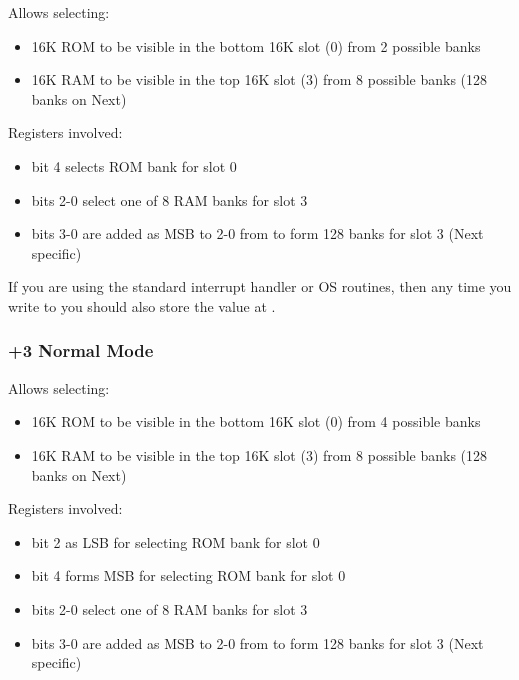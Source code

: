 Allows selecting:

\begin{itemize}[topsep=0pt,itemsep=0pt]
	\item 16K ROM to be visible in the bottom 16K slot (0) from 2 possible banks
	\item 16K RAM to be visible in the top 16K slot (3) from 8 possible banks (128 banks on Next)
\end{itemize}

Registers involved:

\begin{itemize}[topsep=0pt,itemsep=0pt]
	\item {} bit 4 selects ROM bank for slot 0
	\item {} bits 2-0 select one of 8 RAM banks for slot 3
	\item {} bits 3-0 are added as MSB to 2-0 from  to form 128 banks for slot 3 (Next specific)
\end{itemize}

If you are using the standard interrupt handler or OS routines, then any time you write to  you should also store the value at .


\subsubsection{+3 Normal Mode}

\begin{PagingTableLegacy}
	\PagingTableLegacyItem{}{$\uparrow$}{}{}{$\uparrow$}
\end{PagingTableLegacy}

Allows selecting:

\begin{itemize}[topsep=0pt,itemsep=0pt]
	\item 16K ROM to be visible in the bottom 16K slot (0) from 4 possible banks
	\item 16K RAM to be visible in the top 16K slot (3) from 8 possible banks (128 banks on Next)
\end{itemize}

Registers involved:

\begin{itemize}[topsep=0pt,itemsep=0pt]
	\item {} bit 2 as LSB for selecting ROM bank for slot 0
	\item {} bit 4 forms MSB for selecting ROM bank for slot 0
	\item {} bits 2-0 select one of 8 RAM banks for slot 3
	\item {} bits 3-0 are added as MSB to 2-0 from  to form 128 banks for slot 3 (Next specific)
\end{itemize}

